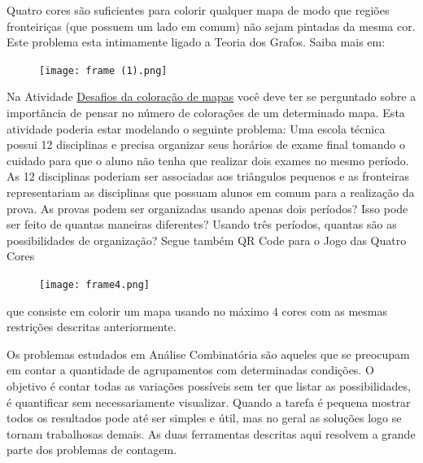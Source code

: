 \begin{knowledge}
Quatro cores são suficientes para colorir qualquer mapa de modo que regiões fronteiriças (que possuem um lado em comum) não sejam pintadas da mesma cor.  Este problema esta intimamente ligado a Teoria dos Grafos. Saiba mais em:  

\begin{figure}[H]
\centering

    \texttt{[image: frame (1).png]}
\end{figure}


Na Atividade \hyperref[coloracao-mapas]{Desafios da coloração de mapas} você deve ter se perguntado sobre a importância de pensar no número de colorações de um determinado mapa. Esta atividade poderia estar modelando o seguinte problema: Uma escola técnica possui 12 disciplinas e precisa organizar seus horários de exame final tomando o cuidado para que o aluno não tenha que realizar dois exames no mesmo período. As 12 disciplinas poderiam ser associadas aos triângulos pequenos e as fronteiras representariam as disciplinas que possuam alunos em comum para a realização da prova. As provas podem ser organizadas usando apenas dois períodos? Isso pode ser feito de quantas maneiras diferentes? Usando três períodos, quantas são as possibilidades de organização?
Segue também QR Code para o Jogo das Quatro Cores

\begin{figure}[H]
\centering

    \texttt{[image: frame4.png]}
\end{figure}

que consiste em colorir um mapa usando no máximo $4$ cores com as mesmas restrições descritas anteriormente.
\end{knowledge}


Os problemas estudados em Análise Combinatória são aqueles que se preocupam em contar a quantidade de agrupamentos com determinadas condições. O objetivo é contar todas as variações possíveis sem ter que listar as possibilidades, é quantificar sem necessariamente visualizar. Quando a tarefa é pequena mostrar todos os resultados pode até ser simples e útil, mas no geral as soluções logo se tornam trabalhosas demais. As duas ferramentas descritas aqui resolvem a grande parte dos problemas de contagem.

